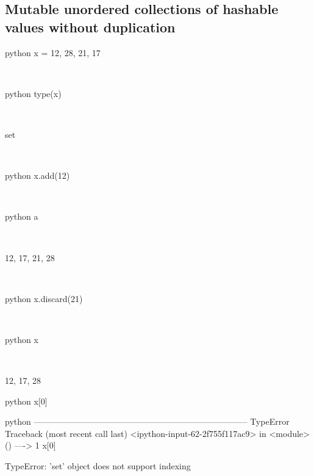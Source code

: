 \documentclass[aspectratio=1610,slidestop]{beamer}
\begin{document}
\subsection{Mutable unordered collections of hashable values without duplication}
\begin{pframe}
 \begin{ipython}
  \begin{pythonin}{python}
x = {12, 28, 21, 17}
  \end{pythonin}
  \\
  \begin{pythonin}{python}
type(x)
  \end{pythonin}
  \\
  \begin{pythonout}
set
  \end{pythonout}
  \\

  \begin{pythonin}{python}
x.add(12)
  \end{pythonin}
  \\
  \begin{pythonin}{python}
a
  \end{pythonin}
  \\
  \begin{pythonout}
{12, 17, 21, 28}
  \end{pythonout}
  \\

  \begin{pythonin}{python}
x.discard(21)
  \end{pythonin}
  \\
  \begin{pythonin}{python}
x
  \end{pythonin}
  \\
  \begin{pythonout}
{12, 17, 28}
  \end{pythonout}
 \end{ipython}
\end{pframe}

\begin{pframe}
 \begin{ipython}
  \begin{pythonin}{python}
x[0]
  \end{pythonin}
  \begin{pythonerr}{python}
---------------------------------------------------------------------------
TypeError                                 Traceback (most recent call last)
<ipython-input-62-2f755f117ac9> in <module>()
----> 1 x[0]

TypeError: 'set' object does not support indexing
  \end{pythonerr}
 \end{ipython}
\end{pframe}
\end{document}
